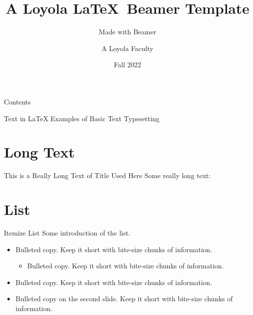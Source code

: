 \documentclass{loyola-beamer}
\title{A Loyola \LaTeX\ Beamer Template}
\subtitle{Made with Beamer}
\author{A Loyola Faculty}
\institute{Loyola University Chicago}
\date{Fall 2022}
\begin{document}
\begin{titleframe}{}
    \maketitle
\end{titleframe}

\begin{frame}{Contents}
\tableofcontents	
\end{frame}

\begin{titleframe}{Text in \LaTeX}
    Examples of Basic Text Typesetting
\end{titleframe}

\section{Long Text}

\begin{frame}{This is a Really Long Text of Title Used Here}
    Some really long text:
    
    \vspace{\baselineskip}
    
    \lipsum[2]
    
\end{frame}

\section{List}

\begin{frame}{Itemize List}
    Some introduction of the list.
    \begin{itemize}
        \item Bulleted copy. Keep it short with bite-size chunks of information.
        \begin{itemize}
            \item Bulleted copy. Keep it short with bite-size chunks of information.
        \end{itemize}
        \item Bulleted copy. Keep it short with bite-size chunks of information.
        \pause\item Bulleted copy on the second slide. Keep it short with bite-size chunks of information.
    \end{itemize}
\end{frame}
\end{document}
